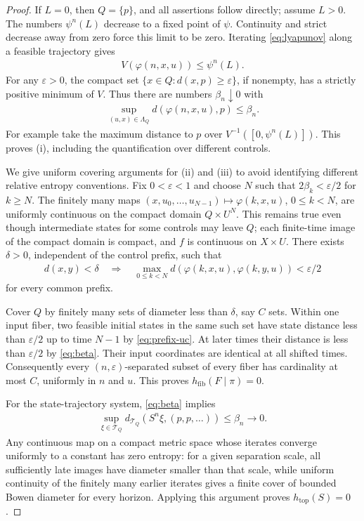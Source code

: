\documentclass[11pt,a4paper]{article}
\theoremstyle{definition}
\theoremstyle{remark}
\begin{document}
\begin{proof}
If \(L=0\), then \(Q=\{p\}\), and all assertions follow directly; assume \(L>0\). The numbers \(\psi^n(L)\) decrease to a fixed point of \(\psi\). Continuity and strict decrease away from zero force this limit to be zero. Iterating \eqref{eq:lyapunov} along a feasible trajectory gives
\begin{align*}
 V(\varphi(n,x,u))\leq\psi^n(L).
\end{align*}
For any \(\varepsilon>0\), the compact set
\(\{x\in Q:d(x,p)\geq\varepsilon\}\), if nonempty, has a strictly positive minimum of \(V\). Thus there are numbers \(\beta_n\downarrow0\) with
\begin{align}\label{eq:beta}
 \sup_{(u,x)\in\Lambda_Q}d(\varphi(n,x,u),p)\leq\beta_n.
\end{align}
For example take the maximum distance to \(p\) over \(V^{-1}([0,\psi^n(L)])\).
This proves (i), including the quantification over different controls.

We give uniform covering arguments for (ii) and (iii) to avoid identifying different relative entropy conventions. Fix \(0<\varepsilon<1\) and choose \(N\) such that \(2\beta_k<\varepsilon/2\) for \(k\geq N\). The finitely many maps
\((x,u_0,\ldots,u_{N-1})\mapsto\varphi(k,x,u)\), \(0\leq k<N\), are uniformly continuous on the compact domain \(Q\times U^N\). This remains true even though intermediate states for some controls may leave \(Q\); each finite-time image of the compact domain is compact, and \(f\) is continuous on \(X\times U\). There exists \(\delta>0\), independent of the control prefix, such that
\begin{align}\label{eq:prefix-uc}
 d(x,y)<\delta\quad\Longrightarrow\quad
 \max_{0\leq k<N}d(\varphi(k,x,u),\varphi(k,y,u))<\varepsilon/2
\end{align}
for every common prefix.

Cover \(Q\) by finitely many sets of diameter less than \(\delta\), say \(C\) sets. Within one input fiber, two feasible initial states in the same such set have state distance less than \(\varepsilon/2\) up to time \(N-1\) by \eqref{eq:prefix-uc}. At later times their distance is less than \(\varepsilon/2\) by \eqref{eq:beta}. Their input coordinates are identical at all shifted times. Consequently every \((n,\varepsilon)\)-separated subset of every fiber has cardinality at most \(C\), uniformly in \(n\) and \(u\). This proves \(h_{\mathrm{fib}}(F\mid\pi)=0\).

For the state-trajectory system, \eqref{eq:beta} implies
\begin{align*}
 \sup_{\xi\in\mathcal T_Q}d_{\mathcal T_Q}(S^n\xi,(p,p,\ldots))
 \leq\beta_n\longrightarrow0.
\end{align*}
Any continuous map on a compact metric space whose iterates converge uniformly to a constant has zero entropy: for a given separation scale, all sufficiently late images have diameter smaller than that scale, while uniform continuity of the finitely many earlier iterates gives a finite cover of bounded Bowen diameter for every horizon. Applying this argument proves \(h_{\mathrm{top}}(S)=0\).


\end{proof}
\end{document}
